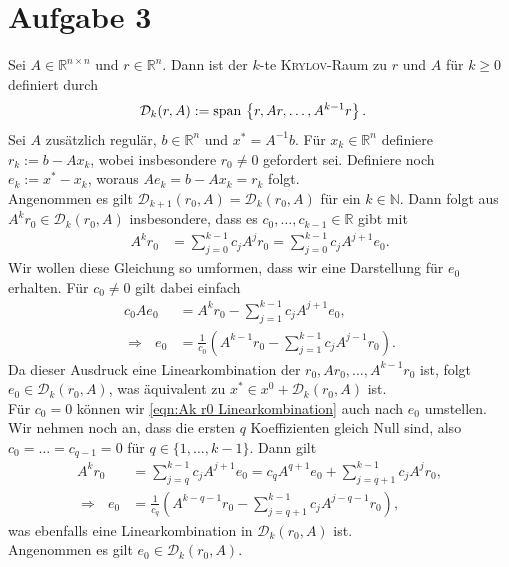 \documentclass[english, parskip=full]{scrartcl}
\newcommand{\kla}{}
\newcommand{\klammer}{}
\newcommand{\tecxt}{}
\begin{document}
\section*{Aufgabe 3}
Sei $A\in\mathbb{R}^{n\times n}$ und $r\in\mathbb{R}^n$. 
Dann ist der $k$-te \textsc{Krylov}-Raum zu $r$ und $A$ für $k\ge 0$ definiert durch
\begin{align}
\mathcal{D}_k(r, A) &:= \tecxt\text{span\,}\klammer\left\{ r, Ar, \dots, A^{k-1}r \right\}.
\end{align}
Sei $A$ zusätzlich regulär, $b\in\mathbb{R}^n$ und $x^\ast = A^{-1}b$.
Für $x_k\in\mathbb{R}^n$ definiere $r_k := b-Ax_k$, wobei insbesondere $r_0\neq 0$ gefordert sei.
Definiere noch $e_k := x^\ast - x_k$, woraus $Ae_k = b - Ax_k = r_k$ folgt.
\\
Angenommen es gilt $\mathcal{D}_{k+1}(r_0, A) = \mathcal{D}_k(r_0, A)$ für ein $k\in\mathbb{N}$.
Dann folgt aus $A^kr_0 \in \mathcal{D}_k(r_0, A)$ insbesondere, dass es $c_0,\dots,c_{k-1}\in\mathbb{R}$ gibt mit
\begin{align}
A^k r_0 &= \sum_{j=0}^{k-1} c_jA^jr_0 = \sum_{j=0}^{k-1} c_jA^{j+1}e_0. \label{eqn:Ak r0 Linearkombination}
\end{align}
Wir wollen diese Gleichung so umformen, dass wir eine Darstellung für $e_0$ erhalten.
Für $c_0\neq 0 $ gilt dabei einfach
\begin{align}
c_0Ae_0 &= A^kr_0 - \sum_{j=1}^{k-1}c_jA^{j+1}e_0,\\
\Rightarrow\ \ \ e_0 &= \frac{1}{c_0}\kla\left( A^{k-1}r_0 - \sum_{j=1}^{k-1}c_jA^{j-1}r_0 \right).
\end{align}
Da dieser Ausdruck eine Linearkombination der $r_0, Ar_0, \dots, A^{k-1}r_0$ ist, folgt $e_0 \in \mathcal{D}_k(r_0, A)$, was äquivalent zu $x^\ast \in x^0 + \mathcal{D}_k(r_0, A)$ ist.
\\
Für $c_0 = 0$ können wir \autoref{eqn:Ak r0 Linearkombination} auch nach $e_0$ umstellen.
Wir nehmen noch an, dass die ersten $q$ Koeffizienten gleich Null sind, also $c_0 = \dots = c_{q-1} = 0$ für $q\in\{1,\dots,k-1\}$.
Dann gilt
\begin{align}
A^kr_0 &= \sum_{j=q}^{k-1}c_jA^{j+1}e_0 = c_qA^{q+1}e_0 + \sum_{j=q+1}^{k-1}c_jA^jr_0,\\
\Rightarrow\ \ \ e_0 &= \frac{1}{c_q}\kla\left( A^{k-q-1}r_0 - \sum_{j=q+1}^{k-1}c_jA^{j-q-1}r_0 \right),
\end{align}
was ebenfalls eine Linearkombination in $\mathcal{D}_k(r_0, A)$ ist.
\\
Angenommen es gilt $e_0 \in \mathcal{D}_k(r_0, A)$.
\end{document}
